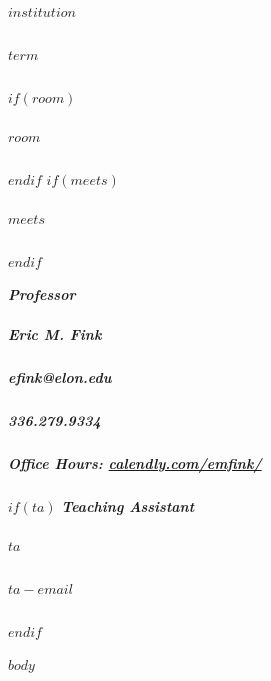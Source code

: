 \documentclass[11pt,letterpaper,twoside]{article}
\begin{document}
\thispagestyle{empty}

\color{OffBlack}

{\huge\bfseries\sffamily\color{Maroon}{$title$}}

\vspace{1em}
\subparagraph{$institution$}
\subparagraph{$term$}
$if(room)$\subparagraph{$room$}$endif$
$if(meets)$\subparagraph{$meets$}$endif$
\vspace{1em}

{\small\bfseries\itshape{Professor}}
\subparagraph{Eric M. Fink} 
\subparagraph{efink@elon.edu}
\subparagraph{336.279.9334} 
\subparagraph{Office Hours: {\url{calendly.com/emfink/}}}
$if(ta)$
\vspace{1em}
{\small\bfseries\itshape{Teaching Assistant}}
\subparagraph{$ta$}
\subparagraph{$ta-email$}
$endif$
\vspace{2em}


$body$
\end{document}
